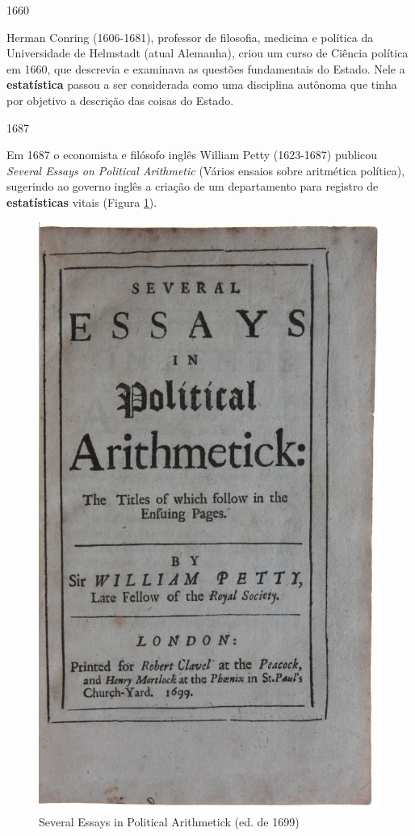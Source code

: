 \documentclass[
]{book}
\begin{document}
\hfill\break

1660

\hfill\break

Herman Conring (1606-1681), professor de filosofia, medicina e política da Universidade de Helmstadt (atual Alemanha), criou um curso de Ciência política em 1660, que descrevia e examinava as questões fundamentais do Estado. Nele a \textbf{estatística} passou a ser considerada como uma disciplina autônoma que tinha por objetivo a descrição das coisas do Estado.

\hfill\break

1687

\hfill\break

Em 1687 o economista e filósofo inglês William Petty (1623-1687) publicou \emph{Several Essays on Political Arithmetic} (Vários ensaios sobre aritmética política), sugerindo ao governo inglês a criação de um departamento para registro de \textbf{estatísticas} vitais (Figura \ref{fig:figA3}).

\hfill\break

\begin{figure}

{\centering \includegraphics[width=0.75\linewidth]{images1/petty} 

}

\caption{Several Essays in Political Arithmetick (ed. de 1699)}\label{fig:figA3}
\end{figure}
\end{document}
